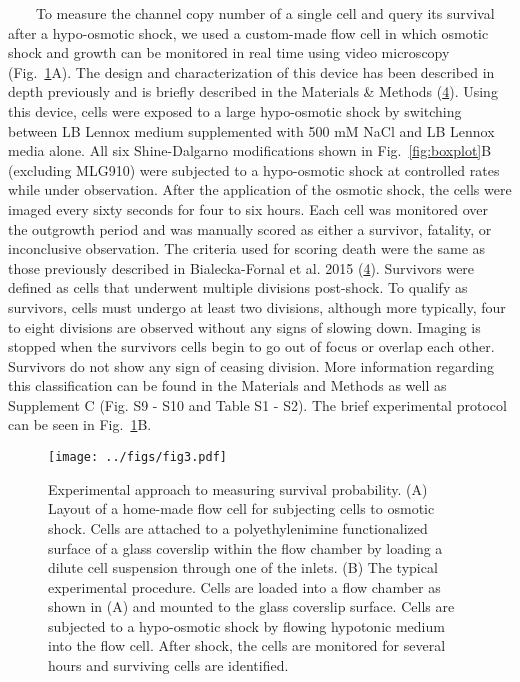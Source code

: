 ~~~~To
measure
the
channel
copy
number
of a
single
cell
and
query
its
survival
after
a
hypo-osmotic
shock,
we
used a
custom-made
flow
cell
in
which
osmotic
shock
and
growth
can be
monitored
in
real
time
using
video
microscopy
(Fig.~\ref{fig:flow_cell}A).
The
design
and
characterization
of
this
device
has
been
described
in
depth
previously
and is
briefly
described
in the
Materials
\&
Methods
(\protect\hyperlink{ref-bialecka-fornal2015}{4}).
Using
this
device,
cells
were
exposed
to a
large
hypo-osmotic
shock
by
switching
between
LB
Lennox
medium
supplemented
with
500 mM
NaCl
and LB
Lennox
media
alone.
All
six
Shine-Dalgarno
modifications
shown
in
Fig.~\ref{fig:boxplot}B
(excluding
MLG910)
were
subjected
to a
hypo-osmotic
shock
at
controlled
rates
while
under
observation.
After
the
application
of the
osmotic
shock,
the
cells
were
imaged
every
sixty
seconds
for
four
to six
hours.
Each
cell
was
monitored
over
the
outgrowth
period
and
was
manually
scored
as
either
a
survivor,
fatality,
or
inconclusive
observation.
The
criteria
used
for
scoring
death
were
the
same
as
those
previously
described
in
Bialecka-Fornal
et al.
2015
(\protect\hyperlink{ref-bialecka-fornal2015}{4}).
Survivors
were
defined
as
cells
that
underwent
multiple
divisions
post-shock.
To
qualify
as
survivors,
cells
must
undergo
at
least
two
divisions,
although
more
typically,
four
to
eight
divisions
are
observed
without
any
signs
of
slowing
down.
Imaging
is
stopped
when
the
survivors
cells
begin
to go
out of
focus
or
overlap
each
other.
Survivors
do not
show
any
sign
of
ceasing
division.
More
information
regarding
this
classification
can be
found
in the
Materials
and
Methods
as
well
as
Supplement
C
(Fig.
S9 -
S10
and
Table
S1 -
S2).
The
brief
experimental
protocol
can be
seen
in
Fig.~\ref{fig:flow_cell}B.

\begin{figure}
\centering
\texttt{[image: ../figs/fig3.pdf]}
\caption{Experimental
approach
to
measuring
survival
probability.
(A)
Layout
of a
home-made
flow
cell
for
subjecting
cells
to
osmotic
shock.
Cells
are
attached
to a
polyethylenimine
functionalized
surface
of a
glass
coverslip
within
the
flow
chamber
by
loading
a
dilute
cell
suspension
through
one of
the
inlets.
(B)
The
typical
experimental
procedure.
Cells
are
loaded
into a
flow
chamber
as
shown
in (A)
and
mounted
to the
glass
coverslip
surface.
Cells
are
subjected
to a
hypo-osmotic
shock
by
flowing
hypotonic
medium
into
the
flow
cell.
After
shock,
the
cells
are
monitored
for
several
hours
and
surviving
cells
are
identified.}\label{fig:flow_cell}
\end{figure}


